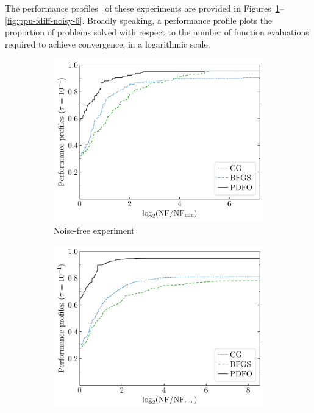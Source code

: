 \documentclass[
    smallextended,  %
    final,        %
]{svjour3}
\begin{document}
The performance profiles~\cite{Dolan_More_2002,More_Wild_2009} of these experiments are provided in Figures~\ref{fig:ppu-fdiff-plain}--\ref{fig:ppu-fdiff-noisy-6}.
Broadly speaking, a performance profile plots the proportion of problems solved with respect to the number of function evaluations required to achieve convergence, in a logarithmic scale.

\begin{figure}[ht]
    \begin{subfigure}{.48\textwidth}
        \centering
        \includegraphics[width=\textwidth]{perf-plain-bfgs_cg_pdfo-50.pdf}
        \caption{Noise-free experiment}
        \label{fig:ppu-fdiff-plain}
    \end{subfigure}
    \hfill
    \begin{subfigure}{.48\textwidth}
        \centering
        \includegraphics[width=\textwidth]{perf-noisy-bfgs_cg_pdfo-50-10.pdf}

\end{subfigure}
\end{figure}
\end{document}
